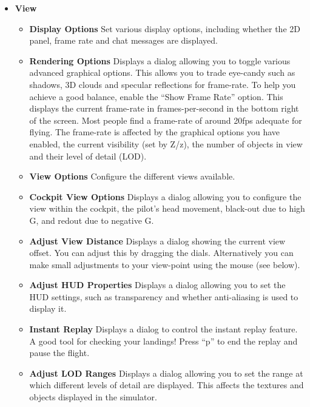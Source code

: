 \begin{itemize}
 \item \textbf{View}
 \begin{itemize}
  \item \textbf{Display Options} Set various display options, including whether
  the 2D panel, frame rate and chat messages are displayed.
  \item \textbf{Rendering Options} Displays a dialog allowing you to toggle
various advanced graphical options.
  This allows you to trade eye-candy such as shadows, 3D clouds and specular
reflections for frame-rate.
  To help you achieve a good balance, enable the ``Show Frame Rate'' option.
  This displays the current frame-rate in frames-per-second in the bottom right
of the screen.
  Most people find a frame-rate of around 20fps adequate for flying. The
frame-rate is affected by the
  graphical options you have enabled, the current visibility (set by Z/z), the
number of objects in view
  and their level of detail (LOD).
  \item \textbf{View Options}  Configure the different views available.
  \item \textbf{Cockpit View Options}  Displays a dialog allowing you to configure
the view within the cockpit, the pilot's head movement, black-out due
to high G, and redout due to negative G.
  \item \textbf{Adjust View Distance}  Displays a dialog showing the current
view offset.
  You can adjust this by dragging the dials. Alternatively you can make small
adjustments
  to your view-point using the mouse (see below).
  \item \textbf{Adjust HUD Properties}  Displays a dialog allowing you to set
the HUD settings, such as transparency and whether anti-aliasing is used to display it.
  \item \textbf{Instant Replay} Displays a dialog to control the instant replay
feature.
  A good tool for checking your landings! Press ``p'' to end the replay and
pause the flight.
  \item \textbf{Adjust LOD Ranges} Displays a dialog allowing you to set the
range at which different
  levels of detail are displayed. This affects the textures and objects
displayed in the simulator.
 \end{itemize}


\end{itemize}

